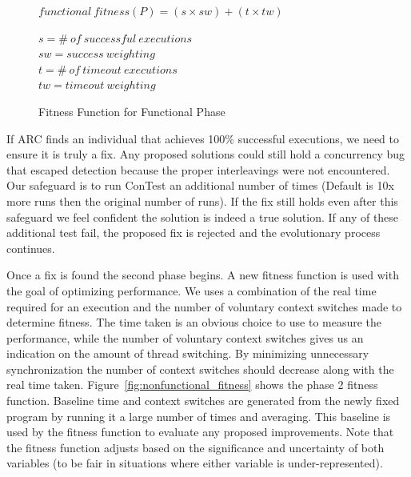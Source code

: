 \documentclass{llncs}
\begin{document}
\begin{figure}
\begin{footnotesize}
\begin{center}
$functional\ fitness(P) = (s \times sw) + (t \times tw)$
\end{center}
\end{footnotesize}
\begin{tiny}
\begin{center}
$s = \#\ of\ successful\ executions$ \\
$sw = success\ weighting$ \\
$t = \#\ of\ timeout\ executions$ \\
$tw = timeout\ weighting$
\end{center}
\end{tiny}
\caption{Fitness Function for Functional Phase}
\label{fig:functional_fitness}
\end{figure}

If ARC finds an individual that achieves 100\% successful executions, we need
to ensure it is truly a fix. Any proposed solutions could still hold a
concurrency bug that escaped detection because the proper interleavings were
not encountered. Our safeguard is to run ConTest an additional number of times
(Default is 10x more runs then the original number of runs). If the fix still
holds even after this safeguard we feel confident the solution is indeed a true
solution. If any of these additional test fail, the proposed fix is rejected
and the evolutionary process continues.

Once a fix is found the second phase begins. A new fitness function is used
with the goal of optimizing performance. We uses a combination of the real time
required for an execution and the number of voluntary context switches made to
determine fitness. The time taken is an obvious choice to use to measure the
performance, while the number of voluntary context switches gives us an
indication on the amount of thread switching. By minimizing unnecessary
synchronization the number of context switches should decrease along with the
real time taken. Figure~\ref{fig:nonfunctional_fitness} shows the phase 2
fitness function. Baseline time and context switches are generated from the
newly fixed program by running it a large number of times and averaging. This
baseline is used by the fitness function to evaluate any proposed improvements.
Note that the fitness function adjusts based on the significance and
uncertainty of both variables (to be fair in situations where either variable
is under-represented).
\end{document}

